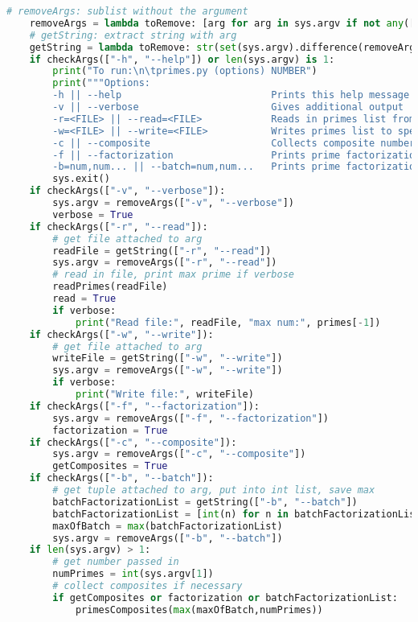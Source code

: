 \documentclass[12pt, twoside, reqno]{book}
\begin{document}
\begin{lstlisting}[language=Python]
    # removeArgs: sublist without the argument
    removeArgs = lambda toRemove: [arg for arg in sys.argv if not any([arg.startswith(s) for s in toRemove])]
    # getString: extract string with arg
    getString = lambda toRemove: str(set(sys.argv).difference(removeArgs(toRemove)).pop()).split('=', 1)[1]
    if checkArgs(["-h", "--help"]) or len(sys.argv) is 1:
        print("To run:\n\tprimes.py (options) NUMBER")
        print("""Options:
        -h || --help                          Prints this help message
        -v || --verbose                       Gives additional output
        -r=<FILE> || --read=<FILE>            Reads in primes list from specified file (JSON)
        -w=<FILE> || --write=<FILE>           Writes primes list to specified file (JSON)
        -c || --composite                     Collects composite numbers also
        -f || --factorization                 Prints prime factorization of NUMBER
        -b=num,num... || --batch=num,num...   Prints prime factorization of num,num,num...""")
        sys.exit()
    if checkArgs(["-v", "--verbose"]):
        sys.argv = removeArgs(["-v", "--verbose"])
        verbose = True
    if checkArgs(["-r", "--read"]):
        # get file attached to arg
        readFile = getString(["-r", "--read"])
        sys.argv = removeArgs(["-r", "--read"])
        # read in file, print max prime if verbose
        readPrimes(readFile)
        read = True
        if verbose:
            print("Read file:", readFile, "max num:", primes[-1])
    if checkArgs(["-w", "--write"]):
        # get file attached to arg
        writeFile = getString(["-w", "--write"])
        sys.argv = removeArgs(["-w", "--write"])
        if verbose:
            print("Write file:", writeFile)
    if checkArgs(["-f", "--factorization"]):
        sys.argv = removeArgs(["-f", "--factorization"])
        factorization = True
    if checkArgs(["-c", "--composite"]):
        sys.argv = removeArgs(["-c", "--composite"])
        getComposites = True
    if checkArgs(["-b", "--batch"]):
        # get tuple attached to arg, put into int list, save max
        batchFactorizationList = getString(["-b", "--batch"])
        batchFactorizationList = [int(n) for n in batchFactorizationList.split(",")]
        maxOfBatch = max(batchFactorizationList)
        sys.argv = removeArgs(["-b", "--batch"])
    if len(sys.argv) > 1:
        # get number passed in
        numPrimes = int(sys.argv[1])
        # collect composites if necessary
        if getComposites or factorization or batchFactorizationList:
            primesComposites(max(maxOfBatch,numPrimes))

\end{lstlisting}
\end{document}
